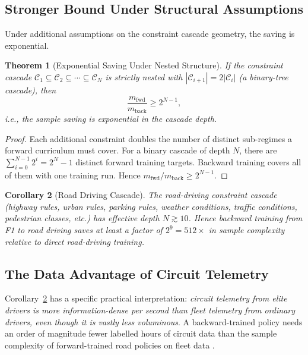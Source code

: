 \documentclass[11pt,twocolumn,a4paper]{article}
\newtheorem{theorem}{Theorem}[section]
\newtheorem{corollary}[theorem]{Corollary}
\newcommand{\cC}{\mathcal{C}}
\begin{document}
\subsection{Stronger Bound Under Structural Assumptions}

Under additional assumptions on the constraint cascade geometry, the saving is exponential.

\begin{theorem}[Exponential Saving Under Nested Structure]
\label{thm:exp-saving}
If the constraint cascade $\cC_1 \subseteq \cC_2 \subseteq \cdots \subseteq \cC_N$ is strictly nested with $|\cC_{i+1}| = 2|\cC_i|$ (a binary-tree cascade), then
\begin{equation}
\frac{m_{\text{fwd}}}{m_{\text{back}}} \ge 2^{N-1},
\end{equation}
i.e., the sample saving is exponential in the cascade depth.
\end{theorem}

\begin{proof}
Each additional constraint doubles the number of distinct sub-regimes a forward curriculum must cover. For a binary cascade of depth $N$, there are $\sum_{i=0}^{N-1} 2^i = 2^N - 1$ distinct forward training targets. Backward training covers all of them with one training run. Hence $m_{\text{fwd}}/m_{\text{back}} \ge 2^{N-1}$.
\end{proof}

\begin{corollary}[Road Driving Cascade]
\label{cor:road-cascade}
The road-driving constraint cascade (highway rules, urban rules, parking rules, weather conditions, traffic conditions, pedestrian classes, etc.) has effective depth $N \gtrsim 10$. Hence backward training from F1 to road driving saves at least a factor of $2^9 = 512\times$ in sample complexity relative to direct road-driving training.
\end{corollary}

\subsection{The Data Advantage of Circuit Telemetry}

Corollary~\ref{cor:road-cascade} has a specific practical interpretation: \emph{circuit telemetry from elite drivers is more information-dense per second than fleet telemetry from ordinary drivers, even though it is vastly less voluminous}. A backward-trained policy needs an order of magnitude fewer labelled hours of circuit data than the sample complexity of forward-trained road policies on fleet data \cite{sachikonye2026driving,bansal2019chauffeurnet}.
\end{document}
